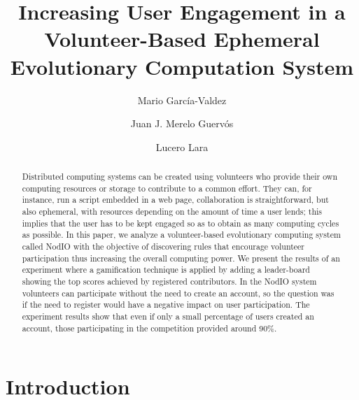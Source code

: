 \documentclass{llncs}
\begin{document}
\sloppy

\title{Increasing User Engagement in a Volunteer-Based Ephemeral Evolutionary Computation System}


\author{Mario Garc\'ia-Valdez \and Juan J. Merelo Guerv\'os \and  Lucero Lara }



\maketitle


\begin{abstract}

Distributed computing systems can be created using volunteers who
provide their own computing resources or storage to contribute to a common effort. They can, for instance,  run a script embedded in a web page, collaboration is straightforward, but also ephemeral, with resources depending on the amount of time a user lends; this  implies that 
the user has to be kept engaged so as to obtain as many computing cycles as
possible. In this paper, we analyze a volunteer-based evolutionary computing system called
NodIO with the objective of discovering rules that encourage volunteer
participation thus increasing the overall computing power. We present the results of
an experiment where a gamification technique is applied by adding a leader-board 
showing the top scores achieved by registered contributors. In the NodIO system volunteers can
participate without the need to create an account, so the question was
if the need to register would have a negative impact on user participation. 
The experiment results show that even if only a small percentage of users created an account,
those participating in the competition provided around 90\%.

\end{abstract}

\section{Introduction}
\end{document}
